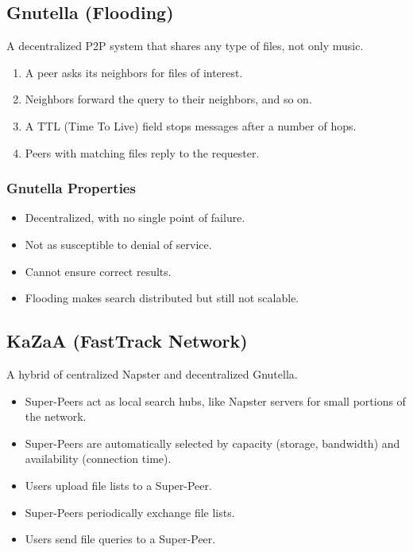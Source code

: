 \documentclass{article}
\begin{document}
\subsection{Gnutella (Flooding)}

A decentralized P2P system that shares any type of files, not only music.

\begin{enumerate}
    \item A peer asks its neighbors for files of interest.
    \item Neighbors forward the query to their neighbors, and so on.
    \item A TTL (Time To Live) field stops messages after a number of hops.
    \item Peers with matching files reply to the requester.
\end{enumerate}

\subsubsection{Gnutella Properties}
\begin{itemize}
    \item Decentralized, with no single point of failure.
    \item Not as susceptible to denial of service.
    \item Cannot ensure correct results.
    \item Flooding makes search distributed but still not scalable.
\end{itemize}

\subsection{KaZaA (FastTrack Network)}

A hybrid of centralized Napster and decentralized Gnutella.

\begin{itemize}
    \item Super-Peers act as local search hubs, like Napster servers for small portions of the network.
    \item Super-Peers are automatically selected by capacity (storage, bandwidth) and availability (connection time).
    \item Users upload file lists to a Super-Peer.
    \item Super-Peers periodically exchange file lists.
    \item Users send file queries to a Super-Peer.
\end{itemize}
\end{document}
